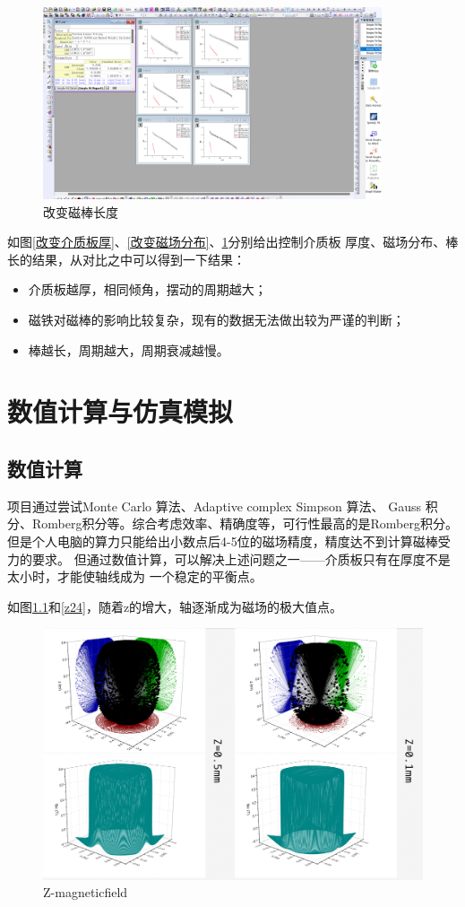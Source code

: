 \documentclass[AutoFakeBold]{LZUThesis}
\begin{document}
\begin{figure}[H]
    \centering
    \includegraphics[width=10cm]{figures/棒长.png}
    \caption{改变磁棒长度}
    \label{改变磁棒长度}
\end{figure}
如图\ref{改变介质板厚}、\ref{改变磁场分布}、\ref{改变磁棒长度}分别给出控制介质板
厚度、磁场分布、棒长的结果，从对比之中可以得到一下结果：
\begin{itemize}
    \item 介质板越厚，相同倾角，摆动的周期越大；
    \item 磁铁对磁棒的影响比较复杂，现有的数据无法做出较为严谨的判断；
    \item 棒越长，周期越大，周期衰减越慢。
\end{itemize}


\chapter{数值计算与仿真模拟}
\section{数值计算}
项目通过尝试Monte Carlo 算法、Adaptive complex Simpson 算法、
Gauss 积分、Romberg积分等\cite{Numerical_Analysis}。综合考虑效率、精确度等，可行性最高的是Romberg积分。
但是个人电脑的算力只能给出小数点后4-5位的磁场精度，精度达不到计算磁棒受力的要求。
但通过数值计算，可以解决上述问题之一——介质板只有在厚度不是太小时，才能使轴线成为
一个稳定的平衡点。

如图\ref{zmag}和\ref{z24}，随着z的增大，轴逐渐成为磁场的极大值点。
\begin{figure}[H]
    \centering
    \includegraphics[width=12cm]{figures/Zmag.png}
    \caption{Z-magneticfield}
    \label{zmag}
\end{figure}
\end{document}

